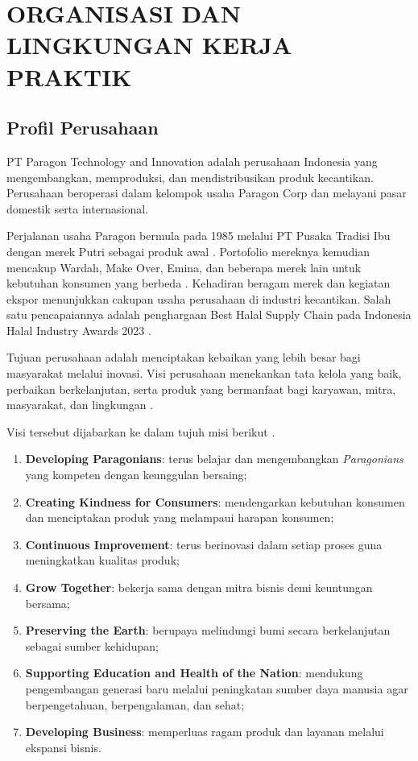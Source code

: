 \cleardoublepage %
\chapter{ORGANISASI DAN LINGKUNGAN KERJA PRAKTIK}
\label{chap:organisasi_lingkungan}
\section{Profil Perusahaan}
\label{sec:profil_perusahaan}
PT Paragon Technology and Innovation adalah perusahaan Indonesia yang mengembangkan, memproduksi, dan mendistribusikan produk kecantikan. Perusahaan beroperasi dalam kelompok usaha Paragon Corp dan melayani pasar domestik serta internasional.

Perjalanan usaha Paragon bermula pada 1985 melalui PT Pusaka Tradisi Ibu dengan merek Putri sebagai produk awal \parencite{paragonAbout}. Portofolio mereknya kemudian mencakup Wardah, Make Over, Emina, dan beberapa merek lain untuk kebutuhan konsumen yang berbeda \parencite{paragonLookLab2022}. Kehadiran beragam merek dan kegiatan ekspor menunjukkan cakupan usaha perusahaan di industri kecantikan. Salah satu pencapaiannya adalah penghargaan Best Halal Supply Chain pada Indonesia Halal Industry Awards 2023 \parencite{paragonIHYA2023}.

Tujuan perusahaan adalah menciptakan kebaikan yang lebih besar bagi masyarakat melalui inovasi. Visi perusahaan menekankan tata kelola yang baik, perbaikan berkelanjutan, serta produk yang bermanfaat bagi karyawan, mitra, masyarakat, dan lingkungan \parencite{paragonAbout}.

Visi tersebut dijabarkan ke dalam tujuh misi berikut \parencite{paragonAbout}.
\begin{enumerate}
    \item \textbf{Developing Paragonians}: terus belajar dan mengembangkan \textit{Paragonians} yang kompeten dengan keunggulan bersaing;
    \item \textbf{Creating Kindness for Consumers}: mendengarkan kebutuhan konsumen dan menciptakan produk yang melampaui harapan konsumen;
    \item \textbf{Continuous Improvement}: terus berinovasi dalam setiap proses guna meningkatkan kualitas produk;
    \item \textbf{Grow Together}: bekerja sama dengan mitra bisnis demi keuntungan bersama;
    \item \textbf{Preserving the Earth}: berupaya melindungi bumi secara berkelanjutan sebagai sumber kehidupan;
    \item \textbf{Supporting Education and Health of the Nation}: mendukung pengembangan generasi baru melalui peningkatan sumber daya manusia agar berpengetahuan, berpengalaman, dan sehat;
    \item \textbf{Developing Business}: memperluas ragam produk dan layanan melalui ekspansi bisnis.
\end{enumerate}

